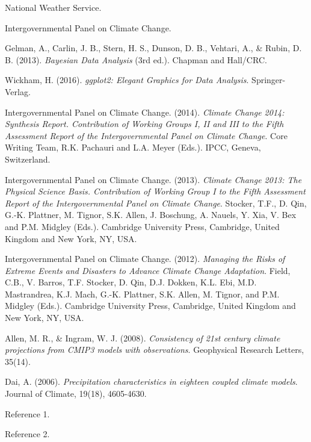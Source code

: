 \documentclass{article}
\begin{document}
\begin{thebibliography}{10}

National Weather Service.

Intergovernmental Panel on Climate Change.

Gelman, A., Carlin, J. B., Stern, H. S., Dunson, D. B., Vehtari, A., \& Rubin, D. B. (2013).
\textit{Bayesian Data Analysis} (3rd ed.).
Chapman and Hall/CRC.

Wickham, H. (2016).
\textit{ggplot2: Elegant Graphics for Data Analysis}.
Springer-Verlag.

Intergovernmental Panel on Climate Change. (2014).
\textit{Climate Change 2014: Synthesis Report. Contribution of Working Groups I, II and III to the Fifth Assessment Report of the Intergovernmental Panel on Climate Change}.
Core Writing Team, R.K. Pachauri and L.A. Meyer (Eds.).
IPCC, Geneva, Switzerland.

Intergovernmental Panel on Climate Change. (2013).
\textit{Climate Change 2013: The Physical Science Basis. Contribution of Working Group I to the Fifth Assessment Report of the Intergovernmental Panel on Climate Change}.
Stocker, T.F., D. Qin, G.-K. Plattner, M. Tignor, S.K. Allen, J. Boschung, A. Nauels, Y. Xia, V. Bex and P.M. Midgley (Eds.).
Cambridge University Press, Cambridge, United Kingdom and New York, NY, USA.

Intergovernmental Panel on Climate Change. (2012).
\textit{Managing the Risks of Extreme Events and Disasters to Advance Climate Change Adaptation}.
Field, C.B., V. Barros, T.F. Stocker, D. Qin, D.J. Dokken, K.L. Ebi, M.D. Mastrandrea, K.J. Mach, G.-K. Plattner, S.K. Allen, M. Tignor, and P.M. Midgley (Eds.).
Cambridge University Press, Cambridge, United Kingdom and New York, NY, USA.

Allen, M. R., \& Ingram, W. J. (2008).
\textit{Consistency of 21st century climate projections from CMIP3 models with observations}.
Geophysical Research Letters, 35(14).

Dai, A. (2006).
\textit{Precipitation characteristics in eighteen coupled climate models}.
Journal of Climate, 19(18), 4605-4630.

Reference 1.

Reference 2.


\end{thebibliography}
\end{document}
